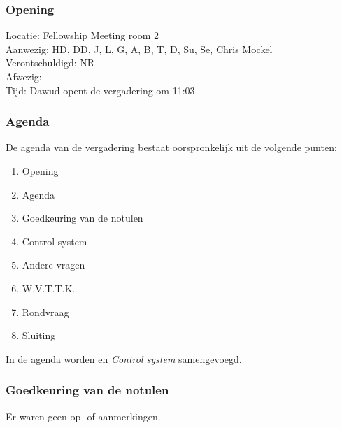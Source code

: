 \subsubsection{Opening}
Locatie: Fellowship Meeting room 2\\
Aanwezig: HD, DD, J, L, G, A, B, T, D, Su, Se, Chris Mockel\\
Verontschuldigd: NR \\
Afwezig: - \\
Tijd: Dawud opent de vergadering om 11:03\\

\subsubsection{Agenda}
De agenda van de vergadering bestaat oorspronkelijk uit de volgende punten:
\begin{enumerate}
\item Opening
\item Agenda
\item Goedkeuring van de notulen
\item Control system
\item Andere vragen
\item W.V.T.T.K.
\item Rondvraag
\item Sluiting
\end{enumerate}

In de agenda worden  en \textit{Control system} samengevoegd.

\subsubsection{Goedkeuring van de notulen}
Er waren geen op- of aanmerkingen.

